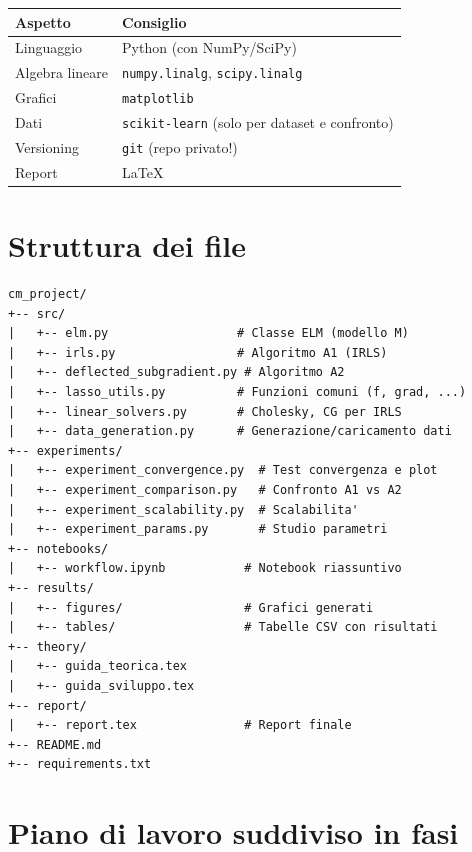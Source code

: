 \documentclass[a4paper,11pt]{article}
\begin{document}
\begin{center}
\begin{tabular}{ll}
\toprule
\textbf{Aspetto} & \textbf{Consiglio} \\
\midrule
Linguaggio & Python (con NumPy/SciPy) \\
Algebra lineare & \texttt{numpy.linalg}, \texttt{scipy.linalg} \\
Grafici & \texttt{matplotlib} \\
Dati & \texttt{scikit-learn} (solo per dataset e confronto) \\
Versioning & \texttt{git} (repo privato!) \\
Report & \LaTeX \\
\bottomrule
\end{tabular}
\end{center}

\section{Struttura dei file}
\label{sec:structure}

\begin{verbatim}
cm_project/
+-- src/
|   +-- elm.py                  # Classe ELM (modello M)
|   +-- irls.py                 # Algoritmo A1 (IRLS)
|   +-- deflected_subgradient.py # Algoritmo A2
|   +-- lasso_utils.py          # Funzioni comuni (f, grad, ...)
|   +-- linear_solvers.py       # Cholesky, CG per IRLS
|   +-- data_generation.py      # Generazione/caricamento dati
+-- experiments/
|   +-- experiment_convergence.py  # Test convergenza e plot
|   +-- experiment_comparison.py   # Confronto A1 vs A2
|   +-- experiment_scalability.py  # Scalabilita'
|   +-- experiment_params.py       # Studio parametri
+-- notebooks/
|   +-- workflow.ipynb           # Notebook riassuntivo
+-- results/
|   +-- figures/                 # Grafici generati
|   +-- tables/                  # Tabelle CSV con risultati
+-- theory/
|   +-- guida_teorica.tex
|   +-- guida_sviluppo.tex
+-- report/
|   +-- report.tex               # Report finale
+-- README.md
+-- requirements.txt
\end{verbatim}

\section{Piano di lavoro suddiviso in fasi}
\label{sec:phases}
\end{document}
